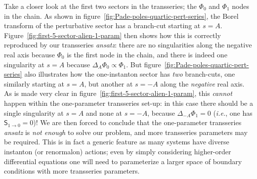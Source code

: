 \documentclass[11pt,a4paper]{article}
\begin{document}
Take a closer look at the first two sectors in the transseries; the $\Phi_0$ and $\Phi_1$ nodes in the chain. As shown in figure~\ref{fig:Pade-poles-quartic-pert-series}, the Borel transform of the perturbative sector has a branch-cut starting at $s=A$. Figure~\ref{fig:first-5-sector-alien-1-param} then shows how this is correctly reproduced by our transseries \textit{ansatz}: there are no singularities along the negative real axis because $\Phi_0$ is the first node in the chain, and there is indeed one singularity at $s=A$ because $\Delta_A \Phi_0 \propto \Phi_1$. But figure~\ref{fig:Pade-poles-quartic-pert-series} also illustrates how the one-instanton sector has \textit{two} branch-cuts, one similarly starting at $s=A$, but another at $s=-A$ along the \textit{negative} real axis. As is made very clear in figure~\ref{fig:first-5-sector-alien-1-param}, this \textit{cannot} happen within the one-parameter transseries set-up: in this case there should be a single singularity at $s=A$ and none at $s=-A$, because $\Delta_{-A}\Phi_1=0$ (\textit{i.e.}, one has $\mathsf{S}_{1\to0}=0$)! We are then forced to conclude that the one-parameter transseries \textit{ansatz} is \textit{not enough} to solve our problem, and more transseries parameters may be required. This is in fact a generic feature as many systems have diverse instanton (or renormalon) actions; even by simply considering higher-order differential equations one will need to parameterize a larger space of boundary conditions with more transseries parameters.
\end{document}
